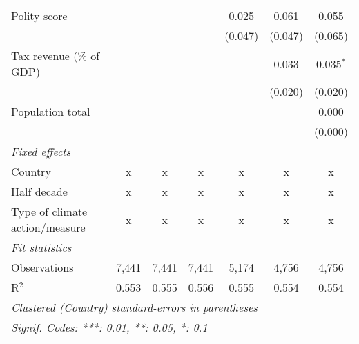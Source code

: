 \begin{tabular}{lcccccc}
   Polity score                                                          &         &                &                & 0.025          & 0.061          & 0.055\\   
                                                                         &         &                &                & (0.047)        & (0.047)        & (0.065)\\   
   Tax revenue (\% of GDP)                                               &         &                &                &                & 0.033          & 0.035$^{*}$\\   
                                                                         &         &                &                &                & (0.020)        & (0.020)\\   
   Population total                                                      &         &                &                &                &                & 0.000\\   
                                                                         &         &                &                &                &                & (0.000)\\   
   \emph{Fixed effects}\\
   Country                                                               & x       & x              & x              & x              & x              & x\\  
   Half decade                                                           & x       & x              & x              & x              & x              & x\\  
   Type of climate action/measure                                        & x       & x              & x              & x              & x              & x\\  
   \midrule \emph{Fit statistics}\\
   Observations                                                          & 7,441   & 7,441          & 7,441          & 5,174          & 4,756          & 4,756\\  
   R$^2$                                                                 & 0.553   & 0.555          & 0.556          & 0.555          & 0.554          & 0.554\\  
   \midrule
   \multicolumn{7}{l}{\emph{Clustered (Country) standard-errors in parentheses}}\\
   \multicolumn{7}{l}{\emph{Signif. Codes: ***: 0.01, **: 0.05, *: 0.1}}\\
\end{tabular}
\par\endgroup



